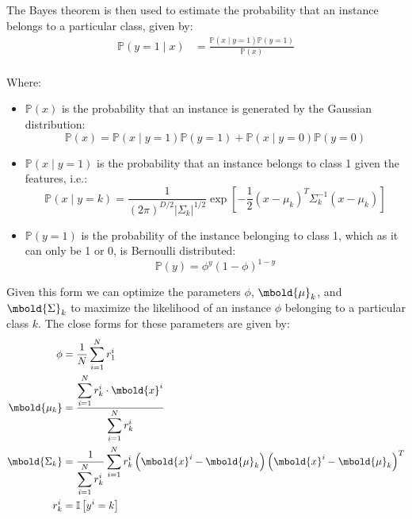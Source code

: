 \documentclass[12pt letter]{report}
\begin{document}
The Bayes theorem is then used to estimate the probability that an instance belongs to a particular class, given by:
\begin{align*}
  \mathbb{P} \left( y = 1  \mid x \right) & =  \frac{\mathbb{P} \left( x  \mid y = 1 \right) \mathbb{P} \left( y = 1
  \right)}{\mathbb{P} \left( x \right) }                                                                             \\
\end{align*}

Where:
\begin{itemize}
  \item $\mathbb{P} \left( x \right) $ is the probability that an instance is generated by the Gaussian distribution:
        \[
          \mathbb{P} \left( x \right)              = \mathbb{P} \left( x  \mid y = 1 \right) \mathbb{P} \left( y = 1
          \right) + \mathbb{P} \left( x  \mid y = 0 \right) \mathbb{P} \left( y = 0 \right)
        \]
  \item  $\mathbb{P} \left( x  \mid y = 1 \right) $ is the probability that an instance belongs to class 1 given
        the features, i.e.:
        \[
          \mathbb{P} \left( x  \mid y = k \right) = \frac{1}{ \left( 2\pi \right)^{D / 2}  \left| \Sigma_k \right|^{1 /
          2}  } \exp \left[ -\frac{1}{2} \left( x - \mu_k \right)^T \Sigma_k^{-1} \left( x - \mu_k \right)   \right]
        \]
  \item $\mathbb{P} \left( y = 1 \right) $ is the probability of the instance belonging to class 1, which as it
        can only be 1 or 0, is Bernoulli distributed:
        \[
          \mathbb{P} \left( y \right) = \phi^y \left( 1 - \phi \right)^{1 - y}
        \]
\end{itemize}

Given this form we can optimize the parameters $\phi$, $\mbold{\mu}_k$, and $\mbold{\Sigma}_k$ to maximize the
likelihood of an instance $\phi$ belonging to a particular class $k$. The close forms for these parameters are given by:
\begin{align*}
  \phi             & = \frac{1}{N} \displaystyle\sum_{i=1}^{N} r^{i}_1                                                     \\
  \mbold{\mu_k}    & = \frac{\displaystyle\sum_{i=1}^{N} r^{i}_k \cdot \mbold{x}^{i}}{\displaystyle\sum_{i=1}^{N} r^{i}_k} \\
  \mbold{\Sigma_k} & = \frac{1}{\displaystyle\sum_{i=1}^{N} r^{i}_k} \displaystyle\sum_{i=1}^{N} r^{i}_k \left(
  \mbold{x}^{i} - \mbold{\mu }_k \right) \left( \mbold{x}^{i} - \mbold{\mu }_k \right)^T                                   \\
  r^{i}_k          & = \mathbb{I} \left[ y^{i} = k \right]
\end{align*}
\end{document}
